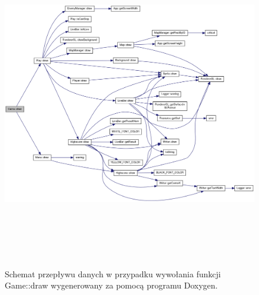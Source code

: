 \begin{figure}[h]
    \centering
    \includegraphics[width=460px,height=550px]{./Pictures/doxygen1.png}
    \caption{Schemat przepływu danych w przypadku wywołania funkcji Game::draw wygenerowany za pomocą programu Doxygen.}
\end{figure}
